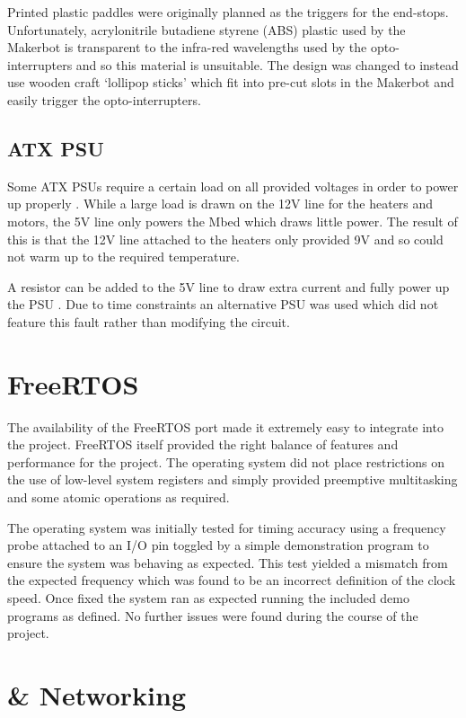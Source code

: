 			Printed plastic paddles were originally planned as the triggers for the
			end-stops. Unfortunately, acrylonitrile butadiene styrene (ABS) plastic
			used by the Makerbot is transparent to the infra-red wavelengths used by
			the opto-interrupters and so this material is unsuitable. The design was
			changed to instead use wooden craft `lollipop sticks' which fit into
			pre-cut slots in the Makerbot and easily trigger the opto-interrupters.
		
		\subsection{ATX PSU}
			
			Some ATX PSUs require a certain load on all provided voltages in order to
			power up properly \cite{reprapatx}. While a large load is drawn on the 12V
			line for the heaters and motors, the 5V line only powers the Mbed which
			draws little power. The result of this is that the 12V line attached to
			the heaters only provided 9V and so could not warm up to the required
			temperature.
			
			A resistor can be added to the 5V line to draw extra current and fully
			power up the PSU \cite{reprapatx}. Due to time constraints an alternative
			PSU was used which did not feature this fault rather than modifying the
			circuit.
	
	\section{FreeRTOS}
		
		The availability of the FreeRTOS port made it extremely easy to integrate
		into the project. FreeRTOS itself provided the right balance of features and
		performance for the project. The operating system did not place restrictions
		on the use of low-level system registers and simply provided preemptive
		multitasking and some atomic operations as required.
		
		The operating system was initially tested for timing accuracy using a
		frequency probe attached to an I/O pin toggled by a simple demonstration
		program to ensure the system was behaving as expected. This test yielded a
		mismatch from the expected frequency which was found to be an incorrect
		definition of the clock speed. Once fixed the system ran as expected running
		the included demo programs as defined. No further issues were found during
		the course of the project.
	
	\section{\uIP{} \& Networking}
		
